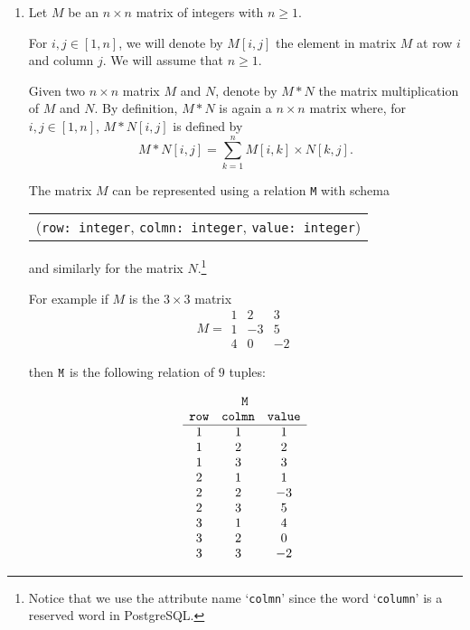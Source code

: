 \documentclass{article}
\begin{document}
\newpage
\begin{enumerate}[resume]
\item  Let $M$ be an $n\times n$ matrix of integers with $n\geq 1$.

For $i, j\in [1,n]$, we will denote by $M[i,j]$ the
element in matrix $M$ at row $i$ and column $j$.   We will assume that $n\geq 1$.

Given two $n\times n$ matrix $M$ and $N$, denote by $M * N$ the matrix multiplication of $M$ and $N$.  
By definition, $M * N$ is again a $n\times n$ matrix where, 
for $i, j\in [1,n]$, $M* N[i,j]$ is defined by
{\small
\[M * N[i,j] = \sum_{k=1}^n M[i,k]\times N[k,j].\]
}

The matrix $M$ can be represented using a relation {\tt M} with schema 
\begin{center}\begin{tabular}{c}
({\tt row: integer}, {\tt colmn: integer}, {\tt value: integer})\end{tabular}\end{center} and similarly for
the matrix $N$.\footnote{Notice that we use the attribute name `{\tt colmn}' since the word `{\tt column}' is a reserved
word in PostgreSQL.}

For example if $M$ is the $3\times 3$ matrix
\[
M = \begin{matrix}
         1 & 2 & 3 \\
         1 & -3 & 5 \\
         4 & 0 &- 2
         \end{matrix}
\]

then ${\tt M}$ is the following relation of $9$ tuples:

\[
\begin{array}{c}
{\tt M} \\ 
 \begin{array}{ccc}
 {\tt row} & {\tt colmn} & {\tt value} \\ \hline
1 & 1 & 1 \\
1 & 2 & 2 \\
1 & 3 & 3 \\
2 & 1 & 1 \\
2 & 2 & -3 \\
2 & 3 & 5 \\
3 & 1 & 4 \\
3 & 2 & 0\\
3 & 3 & -2 \\
 \end{array}
\end{array}
\]


\end{enumerate}
\end{document}
